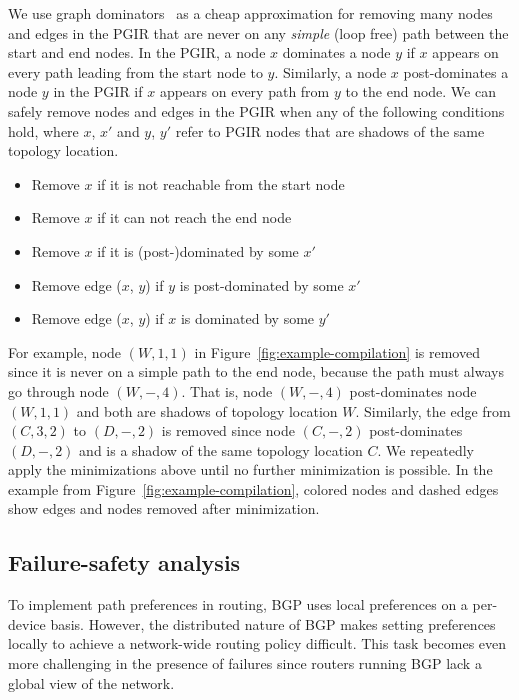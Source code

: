 \documentclass[10pt]{sigalternate052015}
\begin{document}
We use graph dominators~\cite{tarjan-dominance} as a cheap approximation for removing many nodes and edges in the PGIR that are never on any \emph{simple} (loop free) path between the start and end nodes.
In the PGIR, a node $x$ dominates a node $y$ if $x$ appears on every path leading from the start node to $y$. Similarly, a node $x$ post-dominates a node $y$ in the PGIR if $x$ appears on every path from $y$ to the end node.
We can safely remove nodes and edges in the PGIR when any of the following conditions hold, where $x$, $x'$ and $y$, $y'$ refer to PGIR nodes that are shadows of the same topology location.
\begin{itemize}
\setlength{\itemsep}{1pt}
\setlength{\parskip}{0pt}
\setlength{\parsep}{0pt}
\item Remove $x$ if it is not reachable from the start node
\item Remove $x$ if it can not reach the end node
\item Remove $x$ if it is (post-)dominated by some $x'$
\item Remove edge ($x$, $y$) if $y$ is post-dominated by some $x'$
\item Remove edge ($x$, $y$) if $x$ is dominated by some $y'$
\end{itemize}
For example, node $(W,1,1)$ in Figure~\ref{fig:example-compilation} is removed since it is never on a simple path to the end node, because the path must always go through node $(W,-,4)$. That is, node $(W,-,4)$ post-dominates node $(W,1,1)$ and both are shadows of topology location $W$.
Similarly, the edge from $(C,3,2)$ to $(D,-,2)$ is removed since node $(C,-,2)$ post-dominates $(D,-,2)$ and is a shadow of the same topology location $C$.
We repeatedly apply the minimizations above until no further minimization is possible.
In the example from Figure~\ref{fig:example-compilation}, colored nodes and dashed edges show edges and nodes removed after minimization.


\subsection{Failure-safety analysis}

To implement path preferences in routing, BGP uses local preferences on a per-device basis. However, the distributed nature of BGP makes setting preferences locally to achieve a network-wide routing policy difficult. This task becomes even more challenging in the presence of failures since routers running BGP lack a global view of the network.
\end{document}
